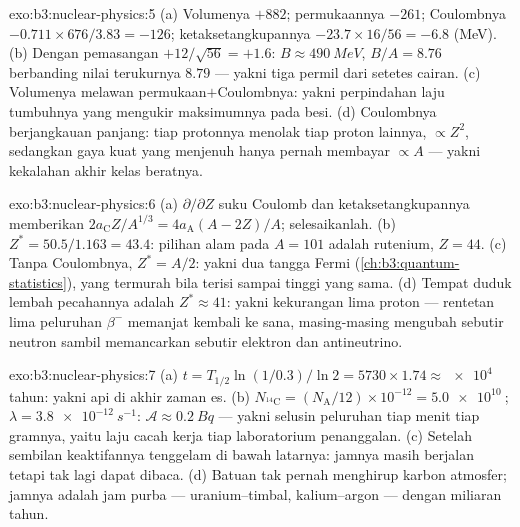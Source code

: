 \begin{solution}{exo:b3:nuclear-physics:5}
(a) Volumenya $+882$; permukaannya $-261$; Coulombnya $-0.711\times676/3.83
= -126$; ketaksetangkupannya $-23.7\times16/56 = -6.8$ (\unit{MeV}). (b)
Dengan pemasangan $+12/\sqrt{56} = +1.6$: $B \approx \qty{490}{MeV}$,
$B/A = 8.76$ berbanding nilai terukurnya $8.79$ --- yakni tiga permil
dari setetes cairan. (c) Volumenya melawan permukaan$+$Coulombnya: yakni
perpindahan laju tumbuhnya yang mengukir maksimumnya pada besi.
(d) Coulombnya berjangkauan panjang: tiap protonnya menolak tiap proton lainnya,
$\propto Z^2$, sedangkan gaya kuat yang menjenuh hanya pernah membayar
$\propto A$ --- yakni kekalahan akhir kelas beratnya.
\end{solution}

\begin{solution}{exo:b3:nuclear-physics:6}
(a) $\partial/\partial Z$ suku Coulomb dan ketaksetangkupannya
memberikan $2a_{\text{C}}Z/A^{1/3} = 4a_{\text{A}}(A - 2Z)/A$; selesaikanlah.
(b) $Z^* = 50.5/1.163 = 43.4$: pilihan alam pada $A = 101$ adalah
rutenium, $Z = 44$. (c) Tanpa Coulombnya, $Z^* = A/2$: yakni dua tangga
Fermi (\cref{ch:b3:quantum-statistics}), yang termurah bila terisi sampai
tinggi yang sama. (d) Tempat duduk lembah pecahannya adalah $Z^* \approx 41$:
yakni kekurangan lima proton --- rentetan lima peluruhan $\beta^-$ memanjat
kembali ke sana, masing-masing mengubah sebutir neutron sambil memancarkan sebutir elektron dan
antineutrino.
\end{solution}

\begin{solution}{exo:b3:nuclear-physics:7}
(a) $t = T_{1/2}\ln(1/0.3)/\ln2 = 5730\times1.74 \approx
\qty{e4}{}$ tahun: yakni api di akhir zaman es. (b) $N_{^{14}\text{C}}
= (N_{\text{A}}/12)\times10^{-12} = \qty{5.0e10}{}$; $\lambda =
\qty{3.8e-12}{s^{-1}}$: $\mathcal A \approx \qty{0.2}{Bq}$ ---
yakni selusin peluruhan tiap menit tiap gramnya, yaitu laju cacah kerja
tiap laboratorium penanggalan. (c) Setelah sembilan  keaktifannya
tenggelam di bawah latarnya: jamnya masih berjalan tetapi tak lagi dapat
dibaca. (d) Batuan tak pernah menghirup karbon atmosfer; jamnya
adalah jam purba --- uranium--timbal,
kalium--argon --- dengan  miliaran tahun.
\end{solution}

